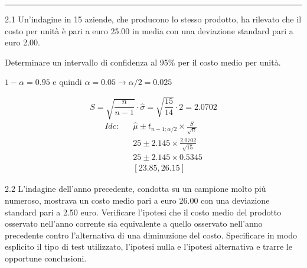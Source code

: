 \documentclass[
  11pt,
]{book}
\theoremstyle{mytheoremstyle}
\theoremstyle{mydefstyle}
\newenvironment{sol}
  {
  \begin{tcolorbox}[enhanced,breakable,arc=0.1mm,boxrule=1pt,colback=white,colframe=iblue,
  title=\bf \fontfamily{lmss}\selectfont \hspace{.5 cm} Soluzione,drop fuzzy shadow]

}{
\end{tcolorbox}
  }
\begin{document}
\begin{center}\rule{0.5\linewidth}{0.5pt}\end{center}

2.1 Un'indagine in 15 aziende, che producono lo stesso prodotto,
ha rilevato che il costo per unità è pari a euro 25.00
in media con una deviazione standard pari a euro 2.00.

Determinare un intervallo di confidenza al 95\%
per il costo medio per unità.

\begin{sol}
\(1-\alpha =0.95\) e quindi \(\alpha=0.05\rightarrow \alpha/2=0.025\)

\[
      S  =\sqrt{\frac {n}{n-1}}\cdot\hat\sigma =
     \sqrt{\frac { 15 }{ 14 }}\cdot 2 = 2.0702 
\]
\begin{eqnarray*}
  Idc: & &  \hat\mu \pm  t_{n-1;\alpha/2} \times \frac{S}{\sqrt{n}} \\
     & &  25 \pm  2.145 \times \frac{ 2.0702 }{\sqrt{ 15 }} \\
     & &  25 \pm  2.145 \times  0.5345 \\
     & & [ 23.85 ,  26.15 ]
\end{eqnarray*}

\end{sol}

2.2 L'indagine dell'anno precedente, condotta
su un campione molto più numeroso, mostrava un costo medio
pari a euro 26.00 con una deviazione standard pari a 2.50 euro.
Verificare l'ipotesi che il costo medio del prodotto osservato
nell'anno corrente sia equivalente a quello osservato nell'anno
precedente contro l'alternativa di una diminuzione del costo.
Specificare in modo esplicito il tipo di test utilizzato,
l'ipotesi nulla e l'ipotesi alternativa e trarre le opportune
conclusioni.
\end{document}
